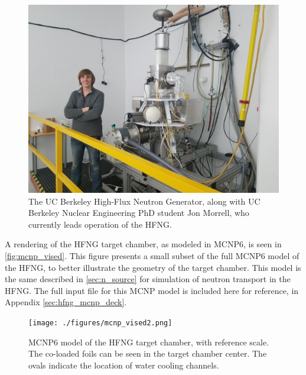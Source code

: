 \begin{figure}
 \centering
 \includegraphics[width=0.75\columnwidth]{./figures/new_hfng_photo.jpg}
 \caption{The UC Berkeley High-Flux Neutron Generator, along with  UC Berkeley Nuclear Engineering PhD student Jon Morrell, who currently leads operation of the HFNG.}
 \label{fig:alt_HFNG}
\end{figure}


A rendering of the HFNG target chamber, as modeled in MCNP6, is seen in \autoref{fig:mcnp_vised}.
This figure presents a small subset of the full MCNP6 model of the HFNG,  to better illustrate the geometry of the target chamber.
This model is the same described in \autoref{sec:n_source} for simulation of neutron transport in the HFNG.
The full input file for this MCNP model is included here for reference, in Appendix \ref{sec:hfng_mcnp_deck}.









\begin{figure}
 \centering
 \texttt{[image: ./figures/mcnp\_vised2.png]}
 \caption{MCNP6 model of the HFNG target chamber, with reference scale. The co-loaded foils can be seen in the target chamber center.  The ovals indicate the location of water cooling channels.}
 \label{fig:mcnp_vised}
\end{figure}






